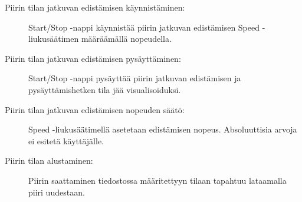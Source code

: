 \documentclass[a4paper,12pt]{article}
\begin{document}
\begin{description}
\item[Piirin tilan jatkuvan edistämisen käynnistäminen:] Start/Stop -nappi käynnistää
piirin jatkuvan edistämisen Speed -liukusäätimen määräämällä nopeudella.
\end{description}

\begin{description}
\item[Piirin tilan jatkuvan edistämisen pysäyttäminen:] Start/Stop -nappi
pysäyttää piirin jatkuvan edistämisen ja pysäyttämishetken tila jää
visualisoiduksi.
\end{description}

\begin{description}
\item[Piirin tilan jatkuvan edistämisen nopeuden säätö:] Speed -liukusäätimellä
asetetaan edistämisen nopeus. Absoluuttisia arvoja ei esitetä
käyttäjälle.
\end{description}

\begin{description}
\item[Piirin tilan alustaminen:] Piirin saattaminen tiedostossa
määritettyyn tilaan tapahtuu lataamalla piiri uudestaan.
\end{description}
\end{document}
